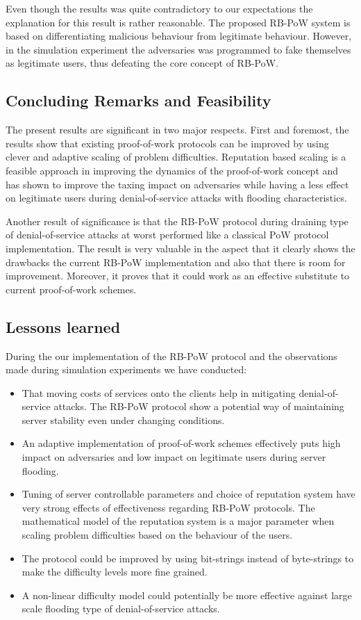 Even though the results was quite contradictory to our expectations the explanation for this result is rather reasonable. The proposed RB-PoW system is based on differentiating malicious behaviour from legitimate behaviour. However, in the simulation experiment the adversaries was programmed to fake themselves as legitimate users, thus defeating the core concept of RB-PoW.


\subsection{Concluding Remarks and Feasibility}
The present results are significant in two major respects. First and foremost, the results show that existing proof-of-work protocols can be improved by using clever and adaptive scaling of problem difficulties. Reputation based scaling is a feasible approach in improving the dynamics of the proof-of-work concept and has shown to improve the taxing impact on adversaries while having a less effect on legitimate users during denial-of-service attacks with flooding characteristics. 

Another result of significance is that the RB-PoW protocol during draining type of denial-of-service attacks at worst performed like a classical PoW protocol implementation. The result is very valuable in the aspect that it clearly shows the drawbacks the current RB-PoW implementation and also that there is room for improvement. Moreover, it proves that it could work as an effective substitute to current proof-of-work schemes. 

\subsection{Lessons learned}
During the our implementation of the RB-PoW protocol and the observations made during simulation experiments we have conducted:
\begin{itemize}
\item That moving costs of services onto the clients help in mitigating denial-of-service attacks. The RB-PoW protocol show a potential way of maintaining server stability even under changing conditions.

\item An adaptive implementation of proof-of-work schemes effectively puts high impact on adversaries and low impact on legitimate users during server flooding.

\item Tuning of server controllable parameters and choice of reputation system have very strong effects of effectiveness regarding RB-PoW protocols. The mathematical model of the reputation system is a major parameter when scaling problem difficulties based on the behaviour of the users.

\item The protocol could be improved by using bit-strings instead of byte-strings to make the difficulty levels more fine grained. 

\item A non-linear difficulty model could potentially be more effective against large scale flooding type of denial-of-service attacks.

\end{itemize}
